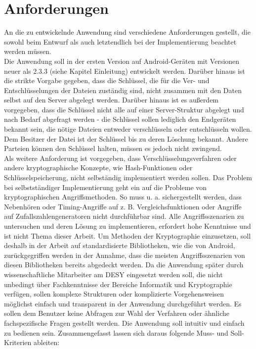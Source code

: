 \documentclass[10pt, a4paper,headsepline]{scrreprt}
\begin{document}
\section{Anforderungen}
An die zu entwickelnde Anwendung sind verschiedene Anforderungen gestellt, die sowohl beim Entwurf als auch letztendlich bei der Implementierung beachtet werden müssen. \\
Die Anwendung soll in der ersten Version auf Android-Geräten mit Versionen neuer als 2.3.3 (siehe Kapitel Einleitung) entwickelt werden. Darüber hinaus ist die strikte Vorgabe gegeben, dass die Schlüssel, die für die Ver- und Entschlüsselungen der Dateien zuständig sind, nicht zusammen mit den Daten selbst auf den Server abgelegt werden. Darüber hinaus ist es außerdem vorgegeben, dass die Schlüssel nicht alle auf einer Server-Struktur abgelegt und nach Bedarf abgefragt werden - die Schlüssel sollen lediglich den Endgeräten bekannt sein, die nötige Dateien entweder verschlüsseln oder entschlüsseln wollen. Dem Besitzer der Datei ist der Schlüssel bis zu deren Löschung bekannt. Andere Parteien können den Schlüssel halten, müssen es jedoch nicht zwingend. \\
Als weitere Anforderung ist vorgegeben, dass Verschlüsselungsverfahren oder andere kryptographische Konzepte, wie Hash-Funktionen oder Schlüsselspeicherung, nicht selbständig implementiert werden sollen. Das Problem bei selbstständiger Implementierung geht ein auf die Probleme von kryptographischen Angriffsmethoden. So muss u. a. sichergestellt werden, dass Nebenhören oder Timing-Angriffe auf z. B. Vergleichsfunktionen oder Angriffe auf Zufallszahlengeneratoren nicht durchführbar sind. Alle Angriffsszenarien zu untersuchen und deren Lösung zu implementieren, erfordert hohe Kenntnisse und ist nicht Thema dieser Arbeit. Um Methoden der Kryptographie einzusetzen, soll deshalb in der Arbeit auf standardisierte Bibliotheken, wie die von Android, zurückgegriffen werden in der Annahme, dass die meisten Angriffsszenarien von diesen Bibliotheken bereits abgedeckt werden. Da die Anwendung später durch wissenschaftliche Mitarbeiter am DESY eingesetzt werden soll, die nicht unbedingt über Fachkenntnisse der Bereiche Informatik und Kryptographie verfügen, sollen komplexe Strukturen oder komplizierte Vorgehensweisen möglichst einfach und transparent in der Anwendung durchgeführt werden. Es sollen dem Benutzer keine Abfragen zur Wahl der Verfahren oder ähnliche fachspezifische Fragen gestellt werden. Die Anwendung soll intuitiv und einfach zu bedienen sein. Zusammengefasst lassen sich daraus folgende Muss- und Soll-Kriterien ableiten: \\ \\ \\
\end{document}
